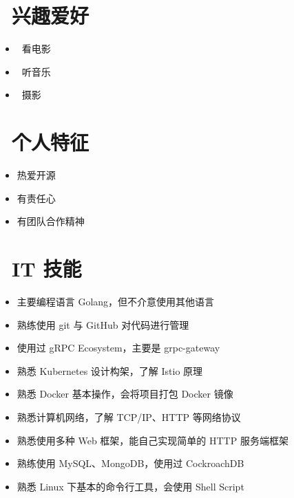 \documentclass{resume}
\begin{document}
\section{\faSunO\ 兴趣爱好} \vspace{1mm}

\begin{itemize}[parsep=1ex]
	\item \faFilm\ {看电影}
	\item \faHeadphones\ {听音乐}
	\item \faCamera\ {摄影}
\end{itemize}

\section{\faUser\ 个人特征} \vspace{1mm}

\begin{itemize}[parsep=1ex]
	\item 热爱开源
	\item 有责任心
	\item 有团队合作精神
\end{itemize}

\section{\faCogs\ IT 技能} \vspace{1mm}

\begin{itemize}[parsep=1ex]
	\item 主要编程语言 Golang，但不介意使用其他语言
	\item 熟练使用 git 与 GitHub 对代码进行管理
	\item 使用过 gRPC Ecosystem，主要是 grpc-gateway
	\item 熟悉 Kubernetes 设计构架，了解 Istio 原理
	\item 熟悉 Docker 基本操作，会将项目打包 Docker 镜像
	\item 熟悉计算机网络，了解 TCP/IP、HTTP 等网络协议
	\item 熟悉使用多种 Web 框架，能自己实现简单的 HTTP 服务端框架
	\item 熟练使用 MySQL、MongoDB，使用过 CockroachDB
	\item 熟悉 Linux 下基本的命令行工具，会使用 Shell Script
\end{itemize}
\end{document}
